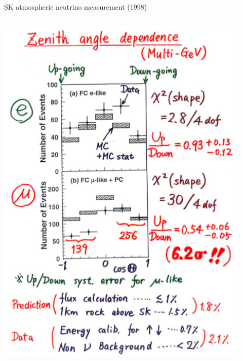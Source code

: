 \begin{frame}[t]{SK atmospheric neutrino measurement (1998)}
\begin{columns}
\begin{column}{0.50\textwidth}
    \includegraphics[width=0.92\textwidth]{./images/3nu/atmo/sk_zenith_1998.png}
  \end{column}
\end{columns}
\end{frame}


